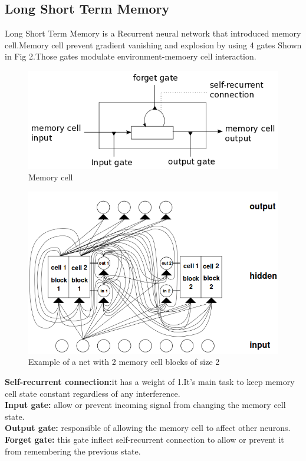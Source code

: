 \documentclass{article}
\begin{document}
\begin{multicols*}{2}
\begin{flushleft}
\subsection{Long Short Term Memory}
Long Short Term Memory is a Recurrent neural network that introduced memory cell.Memory cell prevent gradient vanishing and explosion by using 4 gates Shown in Fig 2.Those gates modulate environment-memoery cell interaction.
\begin{figure}[H]
\includegraphics[scale=0.43]{memory_cell.png}
\caption{ Memory cell \cite{8}}
\end{figure}
\begin{figure}
\includegraphics[width=17cm]{lstm.png}
\caption{Example of a net with 2 memory cell blocks of size 2\cite{9}}
\end{figure}
\textbf{Self-recurrent connection:}it has a weight of 1.It's main task to keep memory cell state constant regardless of any interference.\\
\textbf{Input gate:} allow or prevent incoming signal from changing the memory cell state.\\
\textbf{Output gate:} responsible of allowing the memory cell to affect other neurons.\\
\textbf{Forget gate:} this gate inflect self-recurrent connection to allow or prevent it from remembering the previous state.

\end{flushleft}
\end{multicols*}
\end{document}

